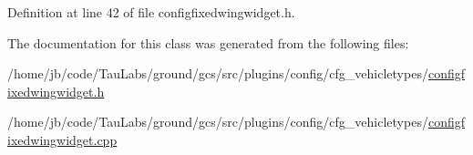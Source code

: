 \-Definition at line 42 of file configfixedwingwidget.\-h.



\-The documentation for this class was generated from the following files\-:\begin{DoxyCompactItemize}
\item 
/home/jb/code/\-Tau\-Labs/ground/gcs/src/plugins/config/cfg\-\_\-vehicletypes/\hyperlink{configfixedwingwidget_8h}{configfixedwingwidget.\-h}\item 
/home/jb/code/\-Tau\-Labs/ground/gcs/src/plugins/config/cfg\-\_\-vehicletypes/\hyperlink{configfixedwingwidget_8cpp}{configfixedwingwidget.\-cpp}\end{DoxyCompactItemize}
